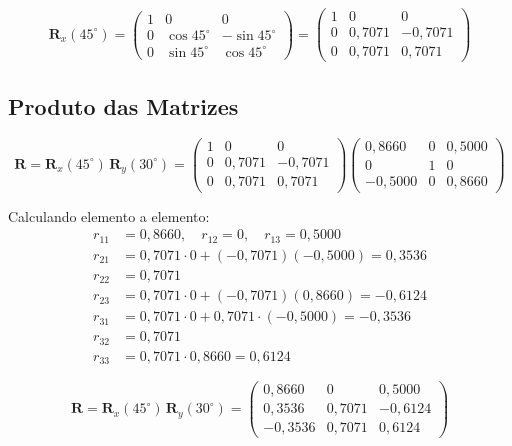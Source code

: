 \documentclass[12pt,a4paper]{article}
\newcommand{\Rx}[1]{\mathbf{R}_x(#1)}
\newcommand{\Ry}[1]{\mathbf{R}_y(#1)}
\newcommand{\degr}{^{\circ}}
\begin{document}
\[
\Rx{45\degr} =
\begin{pmatrix}
  1 & 0           & 0            \\
  0 & \cos 45\degr & -\sin 45\degr \\
  0 & \sin 45\degr &  \cos 45\degr
\end{pmatrix}
=
\begin{pmatrix}
  1 & 0        & 0         \\
  0 & 0{,}7071 & -0{,}7071 \\
  0 & 0{,}7071 &  0{,}7071
\end{pmatrix}
\]

\subsection{Produto das Matrizes}

\[
\mathbf{R} = \Rx{45\degr}\,\Ry{30\degr} =
\begin{pmatrix}
  1 & 0        & 0         \\
  0 & 0{,}7071 & -0{,}7071 \\
  0 & 0{,}7071 &  0{,}7071
\end{pmatrix}
\begin{pmatrix}
  0{,}8660  & 0 & 0{,}5000 \\
  0         & 1 & 0        \\
  -0{,}5000 & 0 & 0{,}8660
\end{pmatrix}
\]

Calculando elemento a elemento:
\begin{align*}
  r_{11} &= 0{,}8660,\quad r_{12} = 0,\quad r_{13} = 0{,}5000 \\
  r_{21} &= 0{,}7071 \cdot 0 + (-0{,}7071)(-0{,}5000) = 0{,}3536 \\
  r_{22} &= 0{,}7071 \\
  r_{23} &= 0{,}7071 \cdot 0 + (-0{,}7071)(0{,}8660) = -0{,}6124 \\
  r_{31} &= 0{,}7071 \cdot 0 + 0{,}7071 \cdot(-0{,}5000) = -0{,}3536 \\
  r_{32} &= 0{,}7071 \\
  r_{33} &= 0{,}7071 \cdot 0{,}8660 = 0{,}6124
\end{align*}

\begin{tcolorbox}[resultbox]
\[
  \mathbf{R} = \Rx{45\degr}\,\Ry{30\degr} =
  \begin{pmatrix}
    0{,}8660  &  0        &  0{,}5000 \\
    0{,}3536  &  0{,}7071 & -0{,}6124 \\
   -0{,}3536  &  0{,}7071 &  0{,}6124
  \end{pmatrix}
\]
\end{tcolorbox}
\end{document}
